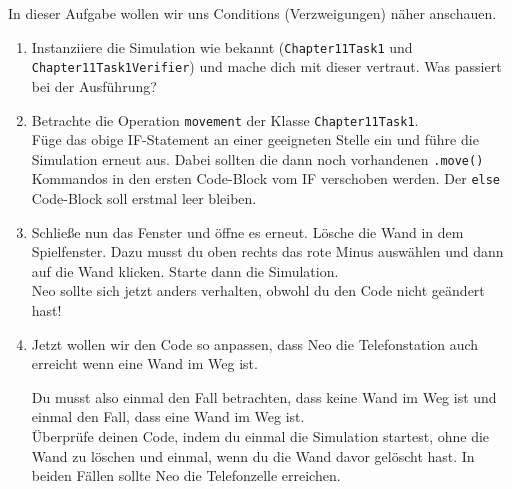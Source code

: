 

In dieser Aufgabe wollen wir uns Conditions (Verzweigungen) näher anschauen.
\begin{enumerate}                           
    \item Instanziiere die Simulation wie bekannt (\lstinline{Chapter11Task1} und \lstinline{Chapter11Task1Verifier}) und mache dich mit dieser vertraut.
        Was passiert bei der Ausführung?
    \item Betrachte die Operation \lstinline{movement} der Klasse \lstinline{Chapter11Task1}.\\
        Füge das obige IF-Statement an einer geeigneten Stelle ein und führe die Simulation erneut aus.
        Dabei sollten die dann noch vorhandenen \lstinline{.move()} Kommandos in den ersten Code-Block vom IF verschoben werden.
        Der \lstinline{else} Code-Block soll erstmal leer bleiben.
    \item Schließe nun das Fenster und öffne es erneut.
        Lösche die Wand in dem Spielfenster.
        Dazu musst du oben rechts das rote Minus auswählen und dann auf die Wand klicken.
        Starte dann die Simulation.\\
        Neo sollte sich jetzt anders verhalten, obwohl du den Code nicht geändert hast!
    \item Jetzt wollen wir den Code so anpassen, dass Neo die Telefonstation auch erreicht wenn eine Wand im Weg ist.

        Du musst also einmal den Fall betrachten, dass keine Wand im Weg ist und einmal den Fall, dass eine Wand im Weg ist.\\

        Überprüfe deinen Code, indem du einmal die Simulation startest, ohne die Wand zu löschen und einmal, wenn du die Wand davor gelöscht hast.
        In beiden Fällen sollte Neo die Telefonzelle erreichen.

\end{enumerate}
